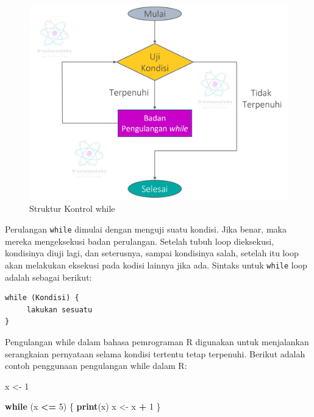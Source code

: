 \documentclass[
]{book}
\newenvironment{Shaded}{\begin{snugshade}}{\end{snugshade}}
\newcommand{\ControlFlowTok}[1]{\textcolor[rgb]{0.13,0.29,0.53}{\textbf{#1}}}
\newcommand{\DecValTok}[1]{\textcolor[rgb]{0.00,0.00,0.81}{#1}}
\newcommand{\FunctionTok}[1]{\textcolor[rgb]{0.13,0.29,0.53}{\textbf{#1}}}
\newcommand{\NormalTok}[1]{#1}
\newcommand{\OtherTok}[1]{\textcolor[rgb]{0.56,0.35,0.01}{#1}}
\newcommand{\SpecialCharTok}[1]{\textcolor[rgb]{0.81,0.36,0.00}{\textbf{#1}}}
\begin{document}
\begin{figure}

{\centering \includegraphics[width=1\linewidth]{./images/Bab6/while} 

}

\caption{Struktur Kontrol while}\label{fig:while}
\end{figure}

Perulangan \texttt{while} dimulai dengan menguji suatu kondisi. Jika benar, maka mereka mengeksekusi badan perulangan. Setelah tubuh loop dieksekusi, kondisinya diuji lagi, dan seterusnya, sampai kondisinya salah, setelah itu loop akan melakukan eksekusi pada kodisi lainnya jika ada. Sintaks untuk \texttt{while} loop adalah sebagai berikut:

\begin{verbatim}
while (Kondisi) {
     lakukan sesuatu 
}
\end{verbatim}

Pengulangan while dalam bahasa pemrograman R digunakan untuk menjalankan serangkaian pernyataan selama kondisi tertentu tetap terpenuhi. Berikut adalah contoh penggunaan pengulangan while dalam R:

\begin{Shaded}
\begin{Highlighting}[]
\NormalTok{x }\OtherTok{\textless{}{-}} \DecValTok{1}

\ControlFlowTok{while}\NormalTok{ (x }\SpecialCharTok{\textless{}=} \DecValTok{5}\NormalTok{) \{}
  \FunctionTok{print}\NormalTok{(x)}
\NormalTok{  x }\OtherTok{\textless{}{-}}\NormalTok{ x }\SpecialCharTok{+} \DecValTok{1}
\NormalTok{\}}
\end{Highlighting}
\end{Shaded}
\end{document}
